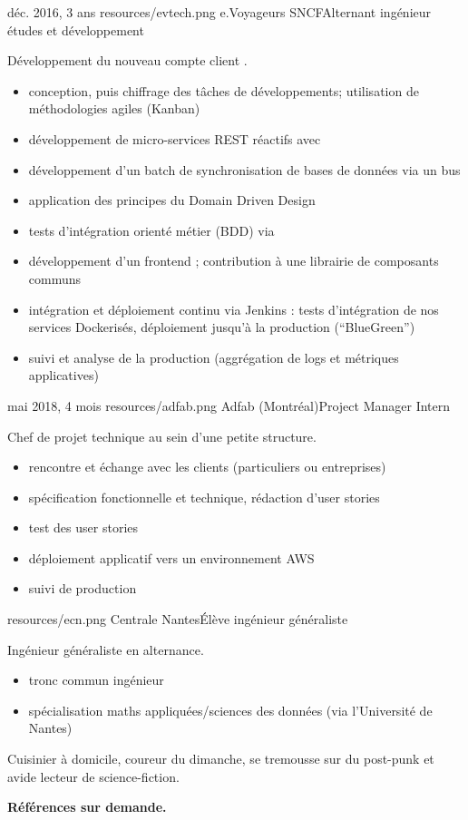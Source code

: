 \documentclass{cv}
\begin{document}
\experience
{{déc. 2016,  3 ans}}
{resources/evtech.png}
{e.Voyageurs SNCF}{Alternant ingénieur études et développement}{

Développement du nouveau compte client \ouisncf{}.	

\begin{itemize}
	\item conception, puis chiffrage des tâches de développements; utilisation de méthodologies agiles (Kanban)
	\item développement de micro-services REST réactifs avec 
	\item développement d'un batch de synchronisation de bases de données via un bus 
	\item application des principes du Domain Driven Design
	\item tests d'intégration orienté métier (BDD) via 
	\item développement d'un frontend ; contribution à une librairie de composants communs
	\item intégration et déploiement continu via Jenkins : tests d'intégration de nos services Dockerisés, 
	déploiement jusqu'à la production (``BlueGreen'')
	\item suivi et analyse de la production (aggrégation de logs et métriques applicatives)
\end{itemize}
}

\experience
{{mai 2018,  4 mois}}
{resources/adfab.png}
{Adfab (Montréal)}{Project Manager Intern}{

Chef de projet technique au sein d'une petite structure.

\begin{itemize}
	\item rencontre et échange avec les clients (particuliers ou entreprises)
	\item spécification fonctionnelle et technique, rédaction d'user stories
	\item test des user stories
	\item déploiement applicatif vers un environnement AWS
	\item suivi de production
\end{itemize}
}


{resources/ecn.png}
{Centrale Nantes}{Élève ingénieur généraliste}{

Ingénieur généraliste en alternance.

\begin{itemize}
	\item tronc commun ingénieur
	\item spécialisation maths appliquées/sciences des données (via l'Université de Nantes)
\end{itemize}
}


Cuisinier à domicile, coureur du dimanche, se tremousse sur du post-punk et avide lecteur de science-fiction.

\vspace{1cm}
\begin{center}
	\bfseries Références sur demande.
\end{center}
\end{document}
